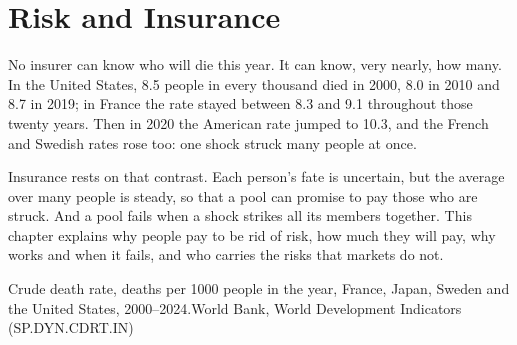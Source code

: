 \chapter{Risk and Insurance}\label{ch:g12:risk-and-insurance}

No insurer can know who will die this year. It can know, very nearly, how many. In the United States, 8.5 people in every thousand died in 2000, 8.0 in 2010 and 8.7 in
2019; in France the rate stayed between 8.3 and 9.1 throughout those twenty years. Then in 2020 the American rate jumped to 10.3, and the French and Swedish rates rose too: one shock struck many people at once.

Insurance rests on that contrast. Each person's fate is uncertain, but the average over many people is steady, so that a pool can promise to pay those who are struck. And
a pool fails when a shock strikes all its members together. This chapter explains why people pay to be rid of risk, how much they will pay, why  works and when
it fails, and who carries the risks that markets do not.

\begin{openingchart}{Crude death rate, deaths per 1000 people in the year, France, Japan, Sweden and the United States, 2000--2024.}{World Bank, World Development
Indicators (SP.DYN.CDRT.IN)}
\end{openingchart}

